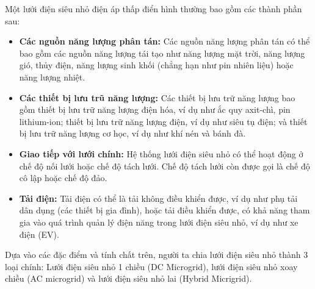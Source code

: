 Một lưới điện siêu nhỏ điện áp thấp điển hình thường bao gồm các thành phần sau:\par
\begin{itemize}
    \item \textbf{Các nguồn năng lượng phân tán:} Các nguồn năng lượng phân tán có thể bao gồm các nguồn năng lượng tái tạo như năng lượng mặt trời, năng lượng gió, thủy điện, năng lượng sinh khối (chẳng hạn như pin nhiên liệu) hoặc năng lượng nhiệt.
    \item \textbf{Các thiết bị lưu trũ năng lượng:} Các thiết bị lưu trữ năng lượng bao gồm thiết bị lưu trữ năng lượng điện hóa, ví dụ như ắc quy axit-chì, pin lithium-ion; thiết bị lưu trữ năng lượng điện, ví dụ như siêu tụ điện; và thiết bị lưu trữ năng lượng cơ học, ví dụ như khí nén và bánh đà.
    \item \textbf{Giao tiếp với lưới chính:} Hệ thống lưới điện siêu nhỏ có thể hoạt động ở chế độ nối lưới hoặc chế độ tách lưới. Chế độ tách lưới còn được gọi là chế độ cô lập hoặc chế độ đảo. 
    \item \textbf{Tải điện:} Tải điện có thể là tải không điều khiển được, ví dụ như phụ tải dân dụng (các thiết bị gia đình), hoặc tải điều khiển được, có khả năng tham gia vào quá trình quản lý điện năng trong lưới điện siêu nhỏ, ví dụ như xe điện (EV).
\end{itemize} \par
Dựa vào các đặc điểm và tính chất trên, người ta chia lưới điện siêu nhỏ thành 3 loại chính: Lưới điện siêu nhỏ 1 chiều (DC Microgrid), lưới điện siêu nhỏ xoay chiều (AC microgrid) và lưới điện siêu nhỏ lai (Hybrid Micrigrid).\par
